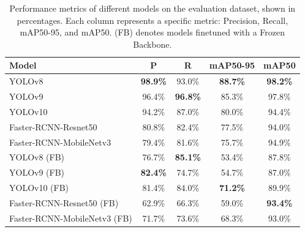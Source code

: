 \documentclass[10pt,twocolumn,letterpaper]{article}
\begin{document}
\begin{table}[thb]
    \scriptsize
    \centering
    \begin{tabular}{lcccc}
        \toprule
        \textbf{Model}               & \textbf{P}      & \textbf{R}      & \textbf{mAP50-95} & \textbf{mAP50}  \\
        \midrule
        YOLOv8                       & \textbf{98.9\%} & 93.0\%          & \textbf{88.7\%}   & \textbf{98.2\%} \\
        YOLOv9                       & 96.4\%          & \textbf{96.8\%} & 85.3\%            & 97.8\%          \\
        YOLOv10                      & 94.2\%          & 87.0\%          & 80.0\%            & 94.4\%          \\
        Faster-RCNN-Resnet50         & 80.8\%          & 82.4\%          & 77.5\%            & 94.0\%          \\
        Faster-RCNN-MobileNetv3      & 79.4\%          & 81.6\%          & 75.7\%            & 94.9\%          \\
        YOLOv8 (FB)                  & 76.7\%          & \textbf{85.1\%} & 53.4\%            & 87.8\%          \\
        YOLOv9 (FB)                  & \textbf{82.4\%} & 74.7\%          & 54.7\%            & 87.0\%          \\
        YOLOv10 (FB)                 & 81.4\%          & 84.0\%          & \textbf{71.2\%}   & 89.9\%          \\
        Faster-RCNN-Resnet50 (FB)    & 62.9\%          & 66.3\%          & 59.0\%            & \textbf{93.4\%} \\
        Faster-RCNN-MobileNetv3 (FB) & 71.7\%          & 73.6\%          & 68.3\%            & 93.0\%          \\
        \bottomrule
    \end{tabular}
    \caption{Performance metrics of different models on the evaluation dataset, shown in percentages. Each column represents a specific metric: Precision, Recall, mAP50-95, and mAP50. (FB) denotes models finetuned with a Frozen Backbone.}
    \label{tab:fretboard-models-metrics-results}
\end{table}
\end{document}

